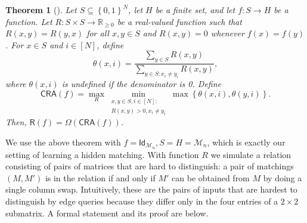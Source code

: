 \documentclass[11pt]{article}
\newcommand{\cM}{\mathcal{M}}
\newcommand{\sR}{\mathsf{R}}
\newcommand{\set}[1]{\left\{ #1 \right\}}
\newcommand{\cbra}[1]{\left\{#1\right\}}
\newcommand{\zone}{\set{0,1}}
\newtheorem{theorem}{Theorem}[section]
\begin{document}
\begin{theorem}[{\cite[Theorem~5]{Aar04}}]\label{thm: classical adversary bound}
    Let $S \subseteq \zone^{N}$, let $H$ be a finite set, and let $f : S \to H$ be a function. Let $R : S \times S \to \mathbb{R}_{\geq 0}$ be a real-valued function such that $R(x, y) = R(y, x)$ for all $x, y \in S$ and $R(x, y) = 0$ whenever $f(x) = f(y)$. For $x \in S$ and $i \in [N]$, define
    $$
    \theta(x, i) = \frac{\sum_{y \in S} R(x, y)}{\sum_{y \in S : x_i \neq y_i} R(x, y)},
    $$
    where $\theta(x, i)$ is undefined if the denominator is 0. Define
    $$
    \mathsf{CRA}(f) = \max_R\min_{\substack{x, y \in S, i \in [N] :\\R(x, y) > 0, x_i \neq y_i}} \max\cbra{\theta(x, i), \theta(y, i)}.
    $$
    Then, $\sR(f) = \Omega(\mathsf{CRA}(f))$.
\end{theorem}

We use the above theorem with $f = \mathsf{Id}_{\cM_n}, S = H = \cM_n$, which is exactly our setting of learning a hidden matching. With function $R$ we simulate a relation consisting of pairs of matrices that are hard to distinguish: a pair of matchings $(M, M')$ is in the relation if and only if $M'$ can be obtained from $M$ by doing a single column swap. Intuitively, these are the pairs of inputs that are hardest to distinguish by edge queries because they differ only in the four entries of a $2\times2$ submatrix. A formal statement and its proof are below.
\end{document}
